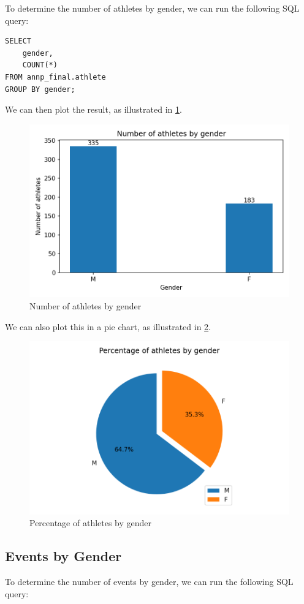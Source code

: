 \documentclass[a4paper, 11pt]{article}
\begin{document}
To determine the number of athletes by gender, we can run the following SQL query:

\begin{verbatim}
SELECT
    gender,
    COUNT(*)
FROM annp_final.athlete
GROUP BY gender;
\end{verbatim}

We can then plot the result, as illustrated in \cref{fig:athletesbygender}.

\begin{figure}[H]
    \centering
    \includegraphics[width=.65\textwidth]{img/athletesbygender}
    \caption{Number of athletes by gender}
    \label{fig:athletesbygender}
\end{figure}

We can also plot this in a pie chart, as illustrated in \cref{fig:athletesbygender-pie}.

\begin{figure}[H]
    \centering
    \includegraphics[width=.65\textwidth]{img/athletesbygender-pie}
    \caption{Percentage of athletes by gender}
    \label{fig:athletesbygender-pie}
\end{figure}

\subsection{Events by Gender}

To determine the number of events by gender, we can run the following SQL query:
\end{document}
